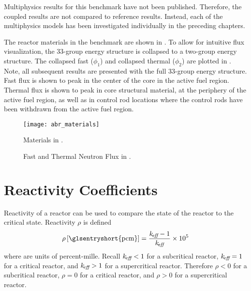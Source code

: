   Multiphysics results for this benchmark have not been published. Therefore,
  the coupled results are not compared to reference results. Instead, each of
  the multiphysics models has been investigated individually in the preceding
  chapters. 

  The reactor materials in the benchmark are shown in .
  To allow for intuitive flux visualization, the 33-group energy structure is
  collapsed to a two-group energy structure. The collapsed fast ($\phi_1$) and
  collapsed thermal ($\phi_2$) are plotted in .  Note, all
  subsequent results are presented with the full 33-group energy structure. Fast
  flux is shown to peak in the center of the core in the active fuel region.
  Thermal flux is shown to peak in core structural material, at the periphery of
  the active fuel region, as well as in control rod locations where the control
  rods have been withdrawn from the active fuel region.

  \begin{figure}
    \centering
    \texttt{[image: abr\_materials]}
    \caption{Materials in .}
    \label{fig:abr_materials}
  \end{figure}

  \begin{figure}
    \centering
    \hspace{0.2in}
    \caption{Fast and Thermal Neutron Flux in .}
    \label{fig:abr_fluxes}
  \end{figure}

\section{Reactivity Coefficients}
\label{sec:reactivity_coefficients}
  Reactivity of a reactor can be used to compare the state of the reactor to the
  critical state. Reactivity $\rho$ is defined
  \begin{equation}
    \label{eq:reactivity}
    \rho \units{\glsentryshort{pcm}} = \frac{\keff-1}{\keff} \times 10^5
  \end{equation}
  where  are units of percent-mille.
  Recall $k_{\!\mbox{\scriptsize \em eff}} < 1$ for a subcritical reactor, $k_{\!\mbox{\scriptsize \em eff}}=1$ for a critical
  reactor, and $k_{\!\mbox{\scriptsize \em eff}} > 1$ for a supercritical reactor. Therefore $\rho < 0$
  for a subcritical reactor, $\rho = 0$ for a critical reactor, and $\rho > 0$
  for a supercritical reactor. 


